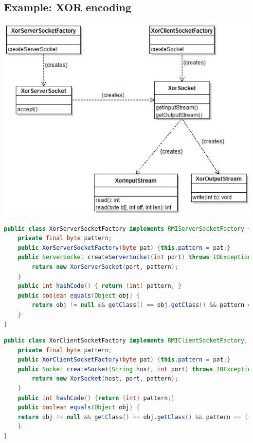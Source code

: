 \documentclass[10pt]{article}
\begin{document}
\subsection{Example: XOR encoding}
\begin{center}
	\includegraphics[scale=0.3]{rmi-factory.png}
\end{center}
\begin{lstlisting}[language=Java, caption=XorServerSocketFactory, style=JavaStyle]
public class XorServerSocketFactory implements RMIServerSocketFactory {
	private final byte pattern;
	public XorServerSocketFactory(byte pat) {this.pattern = pat;}
	public ServerSocket createServerSocket(int port) throws IOException {
		return new XorServerSocket(port, pattern);
	}
	public int hashCode() { return (int) pattern; }
	public boolean equals(Object obj) {
		return obj != null && getClass() == obj.getClass() && pattern == ((XorServerSocketFactory)obj).pattern);
	}
}
\end{lstlisting}
\begin{lstlisting}[language=Java, caption=XorClientSocketFactory, style=JavaStyle]
public class XorClientSocketFactory implements RMIClientSocketFactory, Serializable {
	private final byte pattern;
	public XorClientSocketFactory(byte pat) {this.pattern = pat;}
	public Socket createSocket(String host, int port) throws IOException {
		return new XorSocket(host, port, pattern);
	}
	public int hashCode() {return (int) pattern;}
	public boolean equals(Object obj) {
	return obj != null && getClass() == obj.getClass() && pattern == ((XorClientSocketFactory) obj).pattern;
	}
}
\end{lstlisting}
\end{document}
